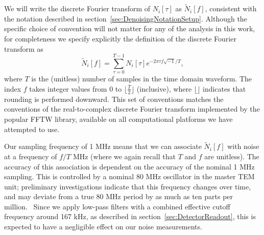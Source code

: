 We will write the discrete Fourier transform of $N_i[\tau]$ as $\widetilde{N}_i[f]$, consistent with the notation described in section~\ref{sec:DenoisingNotationSetup}.  Although the specific choice of convention will not matter for any of the analysis in this work, for completeness we specify explicitly the definition of the discrete Fourier transform as
\begin{equation}
\widetilde{N}_i[f] = \sum_{\tau = 0}^{T-1} N_i[\tau] e^{-2\pi \tau f \sqrt{-1}/T},
\end{equation}
where $T$ is the (unitless) number of samples in the time domain waveform.  The index $f$ takes integer values from 0 to $\lfloor \frac{T}{2} \rfloor$ (inclusive), where $\lfloor\rfloor$ indicates that rounding is performed downward.  This set of conventions matches the conventions of the real-to-complex discrete Fourier transform implemented by the popular FFTW library, available on all computational platforms we have attempted to use.~\cite{FFTW05}

Our sampling frequency of 1 MHz means that we can associate $\widetilde{N}_i[f]$ with noise at a frequency of $f/T$ MHz (where we again recall that $T$ and $f$ are unitless).  The accuracy of this association is dependent on the accuracy of the nominal 1 MHz sampling.  This is controlled by a nominal 80 MHz oscillator in the master TEM unit; preliminary investigations indicate that this frequency changes over time, and may deviate from a true 80 MHz period by as much as ten parts per million.~\cite{DAQWeirdDetails,EXOElectronicsFunctionalSpecification}  Since we apply low-pass filters with a combined effective cutoff frequency around 167 kHz, as described in section~\ref{sec:DetectorReadout}, this is expected to have a negligible effect on our noise measurements.


